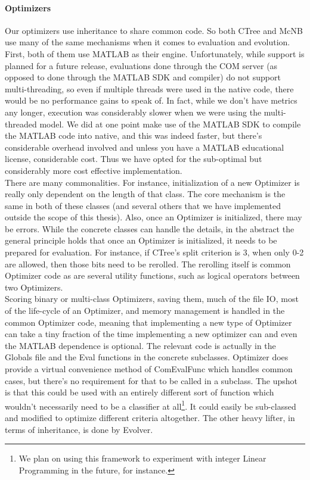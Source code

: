 \paragraph{Optimizers}
Our optimizers use inheritance to share common code.  So both CTree and McNB use many of the same mechanisms when it comes to evaluation and evolution.  First, both of them use MATLAB as their engine.  Unfortunately, while support is planned for a future release, evaluations done through the COM server (as opposed to done through the MATLAB SDK and compiler) do not support multi-threading, so even if multiple threads were used in the native code, there would be no performance gains to speak of.  In fact, while we don't have metrics any longer, execution was considerably slower when we were using the multi-threaded model.  We did at one point make use of the MATLAB SDK to compile the MATLAB code into native, and this was indeed faster, but there's considerable overhead involved and unless you have a MATLAB educational license, considerable cost.  Thus we have opted for the sub-optimal but considerably more cost effective implementation.\\
There are many commonalities.  For instance, initialization of a new Optimizer is really only dependent on the length of that class.  The core mechanism is the same in both of these classes (and several others that we have implemented outside the scope of this thesis).  Also, once an Optimizer is initialized, there may be errors.  While the concrete classes can handle the details, in the abstract the general principle holds that once an Optimizer is initialized, it needs to be prepared for evaluation.  For instance, if CTree's split criterion is 3, when only 0-2 are allowed, then those bits need to be rerolled.  The rerolling itself is common Optimizer code as are several utility functions, such as logical operators between two Optimizers.  \\
Scoring binary or multi-class Optimizers, saving them, much of the file IO, most of the life-cycle of an Optimizer, and memory management is handled in the common Optimizer code, meaning that implementing a new type of Optimizer can take a tiny fraction of the time implementing a new optimizer can and even the MATLAB dependence is optional.  The relevant code is actually in the Globals file and the Eval functions in the concrete subclasses.  Optimizer does provide a virtual convenience method of ComEvalFunc which handles common cases, but there's no requirement for that to be called in a subclass.  The upshot is that this could be used with an entirely different sort of function which wouldn't necessarily need to be a classifier at all\footnote{We plan on using this framework to experiment with integer Linear Programming in the future, for instance.}.  It could easily be sub-classed and modified to optimize different criteria altogether.  The other heavy lifter, in terms of inheritance, is done by Evolver.

